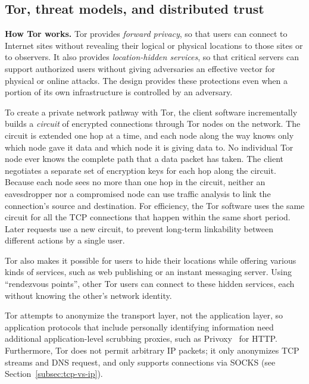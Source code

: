 \documentclass{llncs}
\begin{document}
\subsection{Tor, threat models, and distributed trust}
\label{sec:what-is-tor}


\noindent
{\bf How Tor works.}
Tor provides \emph{forward privacy}, so that users can connect to
Internet sites without revealing their logical or physical locations
to those sites or to observers.  It also provides \emph{location-hidden
services}, so that critical servers can support authorized users without
giving adversaries an effective vector for physical or online attacks.
The design provides these protections even when a portion of its own
infrastructure is controlled by an adversary.

To create a private network pathway with Tor, the client software
incrementally builds a \emph{circuit} of encrypted connections through
Tor nodes on the network. The circuit is extended one hop at a time, and
each node along the way knows only which node gave it data and which
node it is giving data to. No individual Tor node ever knows the complete
path that a data packet has taken. The client negotiates a separate set
of encryption keys for each hop along the circuit.%
Because each node sees no more than one hop in the
circuit, neither an eavesdropper nor a compromised node can use traffic
analysis to link the connection's source and destination.
For efficiency, the Tor software uses the same circuit for all the TCP
connections that happen within the same short period.
Later requests use a new
circuit, to prevent long-term linkability between different actions by
a single user.

Tor also makes it possible for users to hide their locations while
offering various kinds of services, such as web publishing or an instant
messaging server. Using ``rendezvous points'', other Tor users can
connect to these hidden services, each without knowing the other's network
identity.

Tor attempts to anonymize the transport layer, not the application layer, so
application protocols that include personally identifying information need
additional application-level scrubbing proxies, such as
Privoxy~\cite{privoxy} for HTTP.  Furthermore, Tor does not permit arbitrary
IP packets; it only anonymizes TCP streams and DNS request, and only supports
connections via SOCKS (see Section~\ref{subsec:tcp-vs-ip}).
\end{document}
